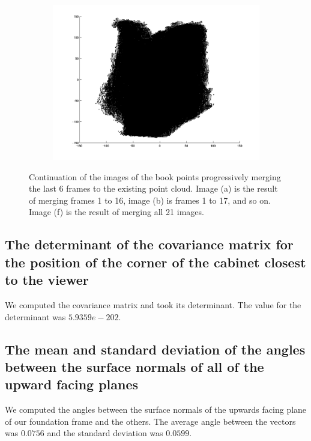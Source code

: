 \begin{figure}
\begin{subfigure}[b]{0.3\textwidth}
		\includegraphics[width=\textwidth]{Images/Book21.png}
		\caption{}
	\end{subfigure}	
		
	\caption{Continuation of the images of the book points progressively merging the last 6 frames to the existing point cloud. Image (a) is the result of merging frames 1 to 16, image (b) is frames 1 to 17, and so on. Image (f) is the result of merging all 21 images.}
	\label{fig:mergedBooks2}
\end{figure}



\subsection{The determinant of the covariance matrix for the position of the corner of the cabinet closest to the viewer}

We computed the covariance matrix and took its determinant. The value for the determinant was $5.9359e-202$.

\subsection{The mean and standard deviation of the angles between the surface normals of all of the upward facing planes}

We computed the angles between the surface normals of the upwards facing plane of our foundation frame and the others. The average angle between the vectors was $0.0756$ and the standard deviation was $0.0599$.